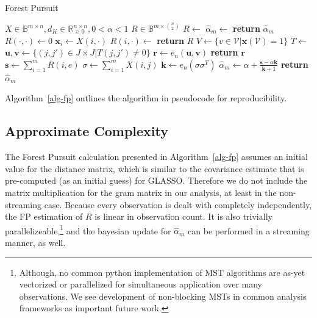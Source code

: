 \documentclass[%
	12pt,
		oneside,
		letterpaper
]{book}
\begin{document}
\begin{algorithm}[htb!]
\caption{Forest Pursuit}
\label{alg-fp}
\begin{algorithmic}[1]
\Require $X\in \mathbb{B}^{m\times n}, d_K\in \mathbb{R}_{\geq 0}^{n\times n}, 0<\alpha<1$
\Ensure $R \in \mathbb{B}^{m \times {n\choose 2}}$
  \State $R \gets $
  \State $\hat{\alpha}_m\gets$
  \State \textbf{return} $\hat{\alpha}_m$
\EndProcedure
{}
  \State $R(\cdot,\cdot) \gets 0$
    \State $\mathbf{x}_i \gets X(i,\cdot)$
    \State $R(i,\cdot) \gets $ 
  \EndFor
  \State \textbf{return} $R$
\EndProcedure
{}
  \State $V \gets \{v\in \mathcal{V} | \mathbf{x}(\mathcal{V})=1\}$
  \State $T \gets$
  \State $\mathbf{u,v}\gets \{(j,j')\in J\times J | T(j,j')\neq 0\}$
  \State $\mathbf{r} \gets e_n(\mathbf{u,v})$
  \State \textbf{return} $\mathbf{r}$ 
\EndProcedure
{}
  \State $\mathbf{s} \gets \sum_{i=1}^m R(i,e)$
  \State $\sigma \gets \sum_{i=1}^m X(i,j)$
  \State $\mathbf{k} \gets e_n(\sigma\sigma^T)$
  \State $\hat{\alpha}_m \gets \alpha + \frac{\mathbf{s}-\alpha \mathbf{k}}{\mathbf{k}+1}$
  \State \textbf{return} $\hat{\alpha}_m$
\EndProcedure
\end{algorithmic}
\end{algorithm}

Algorithm~\ref{alg-fp} outlines the algorithm in pseudocode for
reproducibility.

\subsection{Approximate Complexity}\label{sec-fp-complexity}

The Forest Pursuit calculation presented in Algorithm~\ref{alg-fp}
assumes an initial value for the distance matrix, which is similar to
the covariance estimate that is pre-computed (as an initial guess) for
GLASSO. Therefore we do not include the matrix multiplication for the
gram matrix in our analysis, at least in the non-streaming case. Because
every observation is dealt with completely independently, the FP
estimation of \(R\) is linear in observation count. It is also trivially
parallelizeable,\footnote{Although, no common python implementation of
  MST algorithms are as-yet vectorized or parallelized for simultaneous
  application over many observations. We see development of non-blocking
  MSTs in common analysis frameworks as important future work.} and the
bayesian update for \(\hat{\alpha}_m\) can be performed in a streaming
manner, as well.
\end{document}
